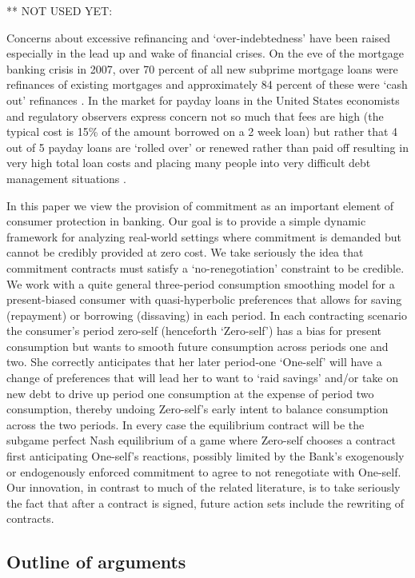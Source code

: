 \documentclass[11pt,english]{article}
\theoremstyle{plain}
\theoremstyle{definition}
\begin{document}
 **
NOT USED YET:

Concerns about excessive refinancing and `over-indebtedness' have
been raised especially in the lead up and wake of financial crises. On the eve of the mortgage banking crisis
in 2007, over 70 percent of all new subprime mortgage loans were refinances
of existing mortgages and approximately 84 percent of these were `cash
out' refinances \citep{demyanyk2011}. In the market
for payday loans in the United States economists and regulatory observers
express concern not so much that fees are high (the typical cost is 15\% of the amount borrowed on a 2 week loan)
but rather that 4 out of 5 payday loans are `rolled over' or renewed
rather than paid off  resulting in very
high total loan costs and placing many people into very difficult
debt management situations \citep{deyoung2015}.


In this paper we view the provision of commitment as an important
element of consumer protection in banking. Our goal is to provide
a simple dynamic framework for analyzing real-world settings where
commitment is demanded but cannot be credibly provided at zero cost.
We take seriously the idea that commitment contracts must satisfy
a `no-renegotiation' constraint to be credible. We work with a quite
general three-period consumption smoothing model for a present-biased
consumer with quasi-hyperbolic preferences that allows for saving
(repayment) or borrowing (dissaving) in each period. In each contracting
scenario the consumer's period zero-self (henceforth `Zero-self')
has a bias for present consumption but wants to smooth future consumption
across periods one and two. She correctly anticipates that her later
period-one `One-self' will have a change of preferences that will
lead her to want to `raid savings' and/or take on new debt to drive
up period one consumption at the expense of period two consumption,
thereby undoing Zero-self's early intent to balance consumption across
the two periods. In every case the equilibrium contract will be the
subgame perfect Nash equilibrium of a game where Zero-self chooses
a contract first anticipating One-self's reactions, possibly limited
by the Bank's exogenously or endogenously enforced commitment to agree
to not renegotiate with One-self. Our innovation, in contrast to much
of the related literature, is to take seriously the fact that after
a contract is signed, future action sets include the rewriting of
contracts.



\subsection{Outline of arguments}
\end{document}
